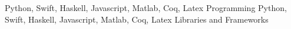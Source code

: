 \begin{cventries}
  \cvsmallentry
    {Python, Swift, Haskell, Javascript, Matlab, Coq, Latex}
    {Programming}
    {}
    {}
    {}
  \cvsmallentry
    {Python, Swift, Haskell, Javascript, Matlab, Coq, Latex}
    {Libraries and Frameworks}
    {}
    {}
    {}
\end{cventries}





